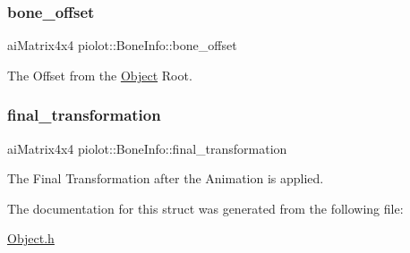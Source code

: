 \subsubsection{\texorpdfstring{bone\+\_\+offset}{bone\_offset}}
{\footnotesize\ttfamily ai\+Matrix4x4 piolot\+::\+Bone\+Info\+::bone\+\_\+offset}



The Offset from the \mbox{\hyperlink{classpiolot_1_1_object}{Object}} Root. 

\mbox{\label{structpiolot_1_1_bone_info_a4b8952561f98ed8384fbed8b9103b7db}} 
\subsubsection{\texorpdfstring{final\+\_\+transformation}{final\_transformation}}
{\footnotesize\ttfamily ai\+Matrix4x4 piolot\+::\+Bone\+Info\+::final\+\_\+transformation}



The Final Transformation after the Animation is applied. 



The documentation for this struct was generated from the following file\+:\begin{DoxyCompactItemize}
\item 
\mbox{\hyperlink{_object_8h}{Object.\+h}}\end{DoxyCompactItemize}
